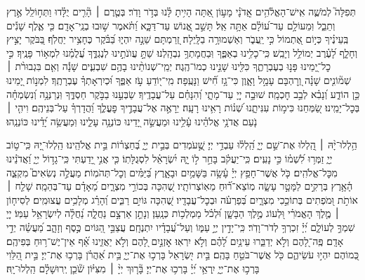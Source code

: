 {	
	תְּפִלָּה֮ לְמֹשֶׁ֢ה אִֽישׁ־הָאֱלֹ֫הִ֥ים אֲֽדֹנָ֗י מָע֣וֹן אַ֭תָּה הָיִ֥יתָ לָּ֗נוּ בְּדֹ֣ר וָדֹֽר׃ בְּטֶ֤רֶם ׀ הָ֘רִ֤ים יֻלָּ֗דוּ וַתְּח֣וֹלֵֽל אֶ֣רֶץ וְתֵבֵ֑ל וּֽמֵעוֹלָ֥ם עַד־ע֝וֹלָ֗ם אַתָּ֥ה אֵֽל׃ תָּשֵׁ֣ב אֱ֭נוֹשׁ עַד־דַּכָּ֑א וַ֝תֹּ֗אמֶר שׁ֣וּבוּ בְנֵֽי־אָדָֽם׃ כִּ֤י אֶ֪לֶף שָׁנִ֡ים בְּֽעֵינֶ֗יךָ כְּי֣וֹם אֶ֭תְמוֹל כִּ֣י יַֽעֲבֹ֑ר וְאַשְׁמוּרָ֥ה בַלָּֽיְלָה׃ זְ֭רַמְתָּם שֵׁנָ֣ה יִהְי֑וּ בַּ֝בֹּ֗קֶר כֶּחָצִ֥יר יַחֲלֹֽף׃ בַּ֭בֹּקֶר יָצִ֣יץ וְחָלָ֑ף לָ֝עֶ֗רֶב יְמוֹלֵ֥ל וְיָבֵֽשׁ׃ כִּֽי־כָלִ֥ינוּ בְאַפֶּ֑ךָ וּֽבַחֲמָתְךָ֥ נִבְהָֽלְנוּ׃ שַׁתָּ֣ עֲוֺנֹתֵ֣ינוּ לְנֶגְדֶּ֑ךָ עֲ֝לֻמֵ֗נוּ לִמְא֥וֹר פָּנֶֽיךָ׃ כִּ֣י כׇל־יָ֭מֵינוּ פָּנ֣וּ בְעֶבְרָתֶ֑ךָ כִּלִּ֖ינוּ שָׁנֵ֣ינוּ כְמוֹ־הֶֽגֶה׃ יְמֵֽי־שְׁנוֹתֵ֨ינוּ בָהֶ֥ם שִׁבְעִ֪ים שָׁנָ֡ה וְאִ֤ם בִּגְבוּרֹ֨ת ׀ שְׁמ֘וֹנִ֤ים שָׁנָ֗ה וְ֭רׇהְבָּם עָמָ֣ל וָאָ֑וֶן כִּי־גָ֥ז חִ֝֗ישׁ וַנָּעֻֽפָה׃ מִֽי־י֭וֹדֵעַ עֹ֣ז אַפֶּ֑ךָ וּ֝כְיִרְאָתְךָ֗ עֶבְרָתֶֽךָ׃ לִמְנ֣וֹת יָ֭מֵינוּ כֵּ֣ן הוֹדַ֑ע וְ֝נָבִ֗א לְבַ֣ב חׇכְמָֽה׃ שׁוּבָ֣ה יְיָ֭ עַד־מָתָ֑י וְ֝הִנָּחֵ֗ם עַל־עֲבָדֶֽיךָ׃ שַׂבְּעֵ֣נוּ בַבֹּ֣קֶר חַסְדֶּ֑ךָ וּֽנְרַנְּנָ֥ה וְ֝נִשְׂמְחָ֗ה בְּכׇל־יָמֵֽינוּ׃ שַׂ֭מְּחֵנוּ כִּימ֣וֹת עִנִּיתָ֑נוּ שְׁ֝נ֗וֹת רָאִ֥ינוּ רָעָֽה׃ יֵרָאֶ֣ה אֶל־עֲבָדֶ֣יךָ פׇעֳלֶ֑ךָ וַ֝הֲדָרְךָ֗ עַל־בְּנֵיהֶֽם׃ וִיהִ֤י ׀ נֹ֤עַם אֲדֹנָ֥י אֱלֹהֵ֗ינוּ עָ֫לֵ֥ינוּ וּמַעֲשֵׂ֣ה יָ֭דֵינוּ כּוֹנְנָ֥ה עָלֵ֑ינוּ וּֽמַעֲשֵׂ֥ה יָ֝דֵ֗ינוּ כּוֹנְנֵֽהוּ׃
	
	\tzadialeph
	
	הַ֥לְלוּ־יָ֨הּ ׀ הַֽ֭לְלוּ אֶת־שֵׁ֣ם יְיָ֑ הַֽ֝לְל֗וּ עַבְדֵ֥י יְיָ׃ שֶׁ֣֭עֹמְדִים בְּבֵ֣ית יְיָ֑ בְּ֝חַצְר֗וֹת בֵּ֣ית אֱלֹהֵֽינוּ׃ הַֽלְלוּ־יָ֭הּ כִּֽי־ט֣וֹב יְיָ֑ זַמְּר֥וּ לִ֝שְׁמ֗וֹ כִּ֣י נָעִֽים׃ כִּֽי־יַעֲקֹ֗ב בָּחַ֣ר ל֣וֹ יָ֑הּ יִ֝שְׂרָאֵ֗ל לִסְגֻלָּתֽוֹ׃ כִּ֤י אֲנִ֣י יָ֭דַעְתִּי כִּֽי־גָד֣וֹל יְיָ֑ וַ֝אֲדֹנֵ֗ינוּ מִכׇּל־אֱלֹהִֽים׃ כֹּ֤ל אֲשֶׁר־חָפֵ֥ץ יְיָ֗ עָ֫שָׂ֥ה בַּשָּׁמַ֥יִם וּבָאָ֑רֶץ בַּ֝יַּמִּ֗ים וְכׇל־תְּהֹמֽוֹת׃ מַעֲלֶ֣ה נְשִׂאִים֮ מִקְצֵ֢ה הָ֫אָ֥רֶץ בְּרָקִ֣ים לַמָּטָ֣ר עָשָׂ֑ה מֽוֹצֵא־ר֝֗וּחַ מֵאֽוֹצְרוֹתָֽיו׃ שֶׁ֭הִכָּה בְּכוֹרֵ֣י מִצְרָ֑יִם מֵ֝אָדָ֗ם עַד־בְּהֵמָֽה׃ שָׁלַ֤ח ׀ אוֹתֹ֣ת וּ֭מֹפְתִים בְּתוֹכֵ֣כִי מִצְרָ֑יִם בְּ֝פַרְעֹ֗ה וּבְכׇל־עֲבָדָֽיו׃ שֶׁ֭הִכָּה גּוֹיִ֣ם רַבִּ֑ים וְ֝הָרַ֗ג מְלָכִ֥ים עֲצוּמִֽים׃ לְסִיח֤וֹן ׀ מֶ֤לֶךְ הָאֱמֹרִ֗י וּ֭לְעוֹג מֶ֣לֶךְ הַבָּשָׁ֑ן וּ֝לְכֹ֗ל מַמְלְכ֥וֹת כְּנָֽעַן׃ וְנָתַ֣ן אַרְצָ֣ם נַחֲלָ֑ה נַ֝חֲלָ֗ה לְיִשְׂרָאֵ֥ל עַמּֽוֹ׃ יְיָ֭ שִׁמְךָ֣ לְעוֹלָ֑ם יְ֝יָ֗ זִכְרְךָ֥ לְדֹר־וָדֹֽר׃ כִּֽי־יָדִ֣ין יְיָ֣ עַמּ֑וֹ וְעַל־עֲ֝בָדָ֗יו יִתְנֶחָֽם׃ עֲצַבֵּ֣י הַ֭גּוֹיִם כֶּ֣סֶף וְזָהָ֑ב מַ֝עֲשֵׂ֗ה יְדֵ֣י אָדָֽם׃ פֶּֽה־לָ֭הֶם וְלֹ֣א יְדַבֵּ֑רוּ עֵינַ֥יִם לָ֝הֶ֗ם וְלֹ֣א יִרְאֽוּ׃ אׇזְנַ֣יִם לָ֭הֶם וְלֹ֣א יַאֲזִ֑ינוּ אַ֝֗ף אֵין־יֶשׁ־ר֥וּחַ בְּפִיהֶֽם׃ כְּ֭מוֹהֶם יִהְי֣וּ עֹשֵׂיהֶ֑ם כֹּ֖ל אֲשֶׁר־בֹּטֵ֣חַ בָּהֶֽם׃ בֵּ֣ית יִ֭שְׂרָאֵל בָּרְכ֣וּ אֶת־יְיָ֑ בֵּ֥ית אַ֝הֲרֹ֗ן בָּרְכ֥וּ אֶת־יְיָ׃ בֵּ֣ית הַ֭לֵּוִי בָּרְכ֣וּ אֶת־יְיָ֑ יִֽרְאֵ֥י יְ֝יָ֗ בָּרְכ֥וּ אֶת־יְיָ׃ בָּ֘ר֤וּךְ יְיָ֨ ׀ מִצִּיּ֗וֹן שֹׁ֘כֵ֤ן יְֽרוּשָׁלָ֗͏ִם הַֽלְלוּ־יָֽהּ׃
	
}
